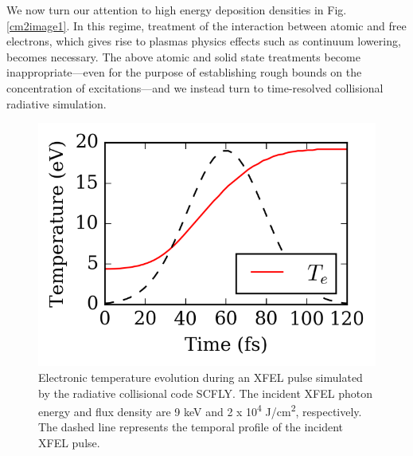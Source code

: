 We now turn our attention to high energy deposition densities in Fig. \ref{cm2image1}.
In this regime, treatment of the interaction between atomic and free
electrons, which gives rise to plasmas physics effects such as continuum
lowering, becomes necessary. The above atomic and solid state treatments
become inappropriate---even for the purpose of establishing rough bounds
on the concentration of excitations---and we instead turn to
time-resolved collisional radiative simulation.

\begin{figure}[h] \label{cm2image3}
\caption{
Electronic temperature evolution during an XFEL pulse
simulated by the radiative collisional code SCFLY. The incident XFEL
photon energy and flux density are 9 keV and 2 x 10\textsuperscript{4}
J/cm\textsuperscript{2}, respectively. The dashed line represents the
temporal profile of the incident XFEL pulse.
}
\centering
\includegraphics{MgO_2.7.docx1503027860/media/image3.png}
\end{figure}

